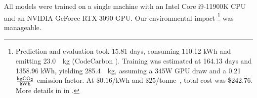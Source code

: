 All models were trained on a single machine with an Intel Core i9-11900K CPU and an NVIDIA GeForce RTX 3090 GPU. 
Our environmental impact
\footnote{Prediction and evaluation took 15.81 days, consuming 110.12 kWh and emitting 23.0~\cotwo~kg (CodeCarbon \cite{lacoste2019codecarbon}). Training was estimated at 164.13 days and 1358.96 kWh, yielding 285.4~\cotwo~kg, assuming a 345W GPU draw and a 0.21~$\frac{\textrm{kg}\mathrm{CO_2}{}}{\textrm{kWh}}$ emission factor. At $\$0.16$/kWh and $\$25$/tonne~\cotwo, total cost was \$242.76. More details in in .}
was manageable.

